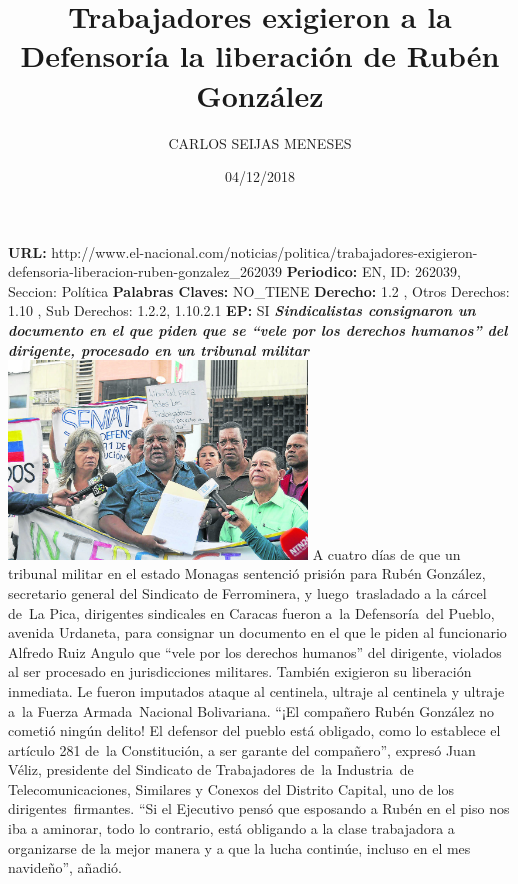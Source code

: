 \documentclass{article}%
\title{\textbf{Trabajadores exigieron a la Defensoría la liberación de Rubén González}}%
\author{CARLOS SEIJAS MENESES}%
\date{04/12/2018}%
\begin{document}
%
\normalsize%
\maketitle%
\textbf{URL: }%
http://www.el{-}nacional.com/noticias/politica/trabajadores{-}exigieron{-}defensoria{-}liberacion{-}ruben{-}gonzalez\_262039\newline%
%
\textbf{Periodico: }%
EN, %
ID: %
262039, %
Seccion: %
Política\newline%
%
\textbf{Palabras Claves: }%
NO\_TIENE\newline%
%
\textbf{Derecho: }%
1.2%
, Otros Derechos: %
1.10%
, Sub Derechos: %
1.2.2, 1.10.2.1%
\newline%
%
\textbf{EP: }%
SI\newline%
\newline%
%
\textbf{\textit{Sindicalistas consignaron un documento en el que piden que se “vele por los derechos humanos” del dirigente, procesado en un tribunal militar}}%
\newline%
\newline%
%
\includegraphics[width=300px]{92.jpg}%
\newline%
%
A cuatro días de que un tribunal militar en el estado Monagas sentenció prisión para Rubén González, secretario general del Sindicato de Ferrominera, y luego~trasladado a la cárcel de~La Pica, dirigentes sindicales en Caracas fueron a~la Defensoría~del Pueblo, avenida Urdaneta, para consignar un documento en el que le piden al funcionario Alfredo Ruiz Angulo que “vele por los derechos humanos” del dirigente, violados al ser procesado en jurisdicciones militares. También exigieron su liberación inmediata. Le fueron imputados ataque al centinela, ultraje al centinela y ultraje a~la Fuerza Armada~Nacional Bolivariana.%
\newline%
%
“¡El compañero Rubén González no cometió ningún delito! El defensor del pueblo está obligado, como lo establece el artículo 281 de~la Constitución, a ser garante del compañero”, expresó Juan Véliz, presidente del Sindicato de Trabajadores de~la Industria~de Telecomunicaciones, Similares y Conexos del Distrito Capital, uno de los dirigentes~firmantes. “Si el Ejecutivo pensó que esposando a Rubén en el piso nos iba a aminorar, todo lo contrario, está obligando a la clase trabajadora a organizarse de la mejor manera y a que la lucha continúe, incluso en el mes navideño”, añadió.%
\end{document}
